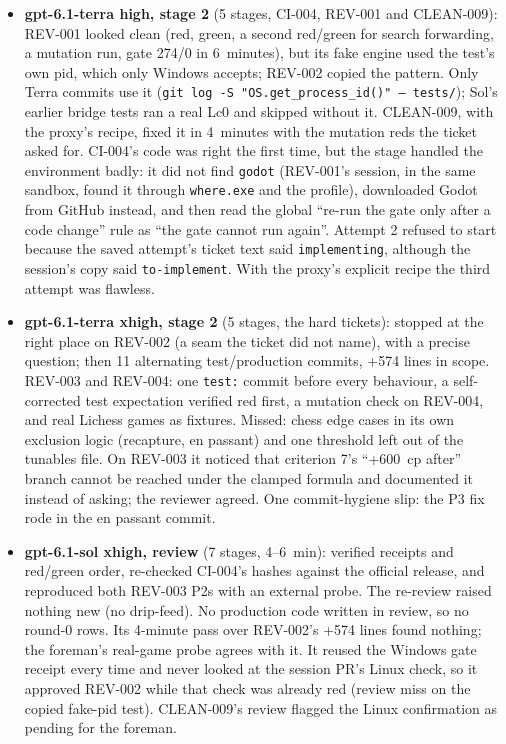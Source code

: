 \documentclass[11pt,a4paper]{article}
\begin{document}
\begin{itemize}
  \item \textbf{gpt-6.1-terra high, stage 2} (5 stages, CI-004, REV-001 and CLEAN-009): REV-001
        looked clean (red, green, a second red/green for search forwarding, a mutation run, gate
        274/0 in 6~minutes), but its fake engine used the test's own pid, which only Windows
        accepts; REV-002 copied the pattern. Only Terra commits use it
        (\texttt{git log -S "OS.get\_process\_id()" -- tests/}); Sol's earlier bridge tests ran a
        real Lc0 and skipped without it. CLEAN-009, with the proxy's recipe, fixed it in 4~minutes
        with the mutation reds the ticket asked for. CI-004's code was right the first time, but the stage handled the environment
        badly: it did not find \texttt{godot} (REV-001's session, in the same sandbox, found it
        through \texttt{where.exe} and the profile), downloaded Godot from GitHub instead, and
        then read the global ``re-run the gate only after a code change'' rule as ``the gate
        cannot run again''. Attempt 2 refused to start because the saved attempt's ticket text
        said \texttt{implementing}, although the session's copy said \texttt{to-implement}. With
        the proxy's explicit recipe the third attempt was flawless.
  \item \textbf{gpt-6.1-terra xhigh, stage 2} (5 stages, the hard tickets): stopped at the right
        place on REV-002 (a seam the ticket did not name), with a precise question; then 11
        alternating test/production commits, +574 lines in scope. REV-003 and REV-004: one
        \texttt{test:} commit before every behaviour, a self-corrected test expectation verified
        red first, a mutation check on REV-004, and real Lichess games as fixtures. Missed: chess
        edge cases in its own exclusion logic (recapture, en passant) and one threshold left out
        of the tunables file. On REV-003 it noticed that criterion 7's ``+600~cp after'' branch
        cannot be reached under the clamped formula and documented it instead of asking; the
        reviewer agreed. One commit-hygiene slip: the P3 fix rode in the en passant commit.
  \item \textbf{gpt-6.1-sol xhigh, review} (7 stages, 4--6~min): verified receipts and red/green
        order, re-checked CI-004's hashes against the official release, and reproduced both
        REV-003 P2s with an external probe. The re-review raised nothing new (no drip-feed). No
        production code written in review, so no round-0 rows. Its 4-minute pass over REV-002's
        +574 lines found nothing; the foreman's real-game probe agrees with it. It reused the
        Windows gate receipt every time and never looked at the session PR's Linux check, so it
        approved REV-002 while that check was already red (review miss on the copied fake-pid
        test). CLEAN-009's review flagged the Linux confirmation as pending for the foreman.
\end{itemize}
\end{document}
